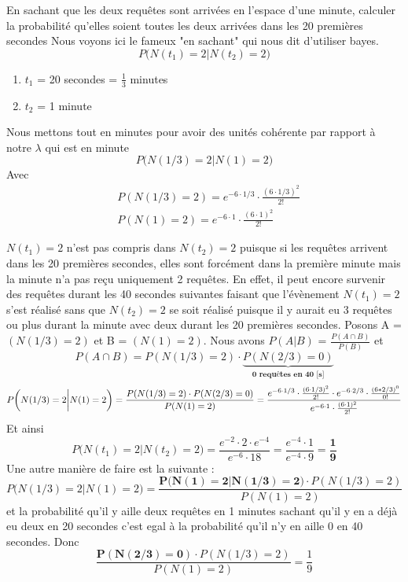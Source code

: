 \begin{exo}
\begin{subexo}{En sachant que les deux requêtes sont arrivées en l'espace d'une minute, calculer
      la probabilité qu'elles soient toutes les deux arrivées dans les 20 premières secondes}
    Nous voyons ici le fameux "en sachant" qui nous dit d'utiliser bayes.
    \[
      P\biggl( N(t_1) = 2 \biggl| N(t_2) = 2\biggr)
    \]
    \begin{enumerate}
      \item $t_1$ = 20 secondes = $\frac{1}{3}$ minutes
      \item $t_2$ = 1 minute
    \end{enumerate}
    Nous mettons tout en minutes pour avoir des unités cohérente par rapport à notre $\lambda$ qui est en minute
    \begin{equation*}
      P\biggl( N(1/3) = 2 \biggl| N(1) = 2\biggr)
    \end{equation*}
    Avec
    \begin{align*}
       & P(N(1/3) = 2) = e^{-6 \cdot 1/3} \cdot \frac{(6 \cdot 1/3)^2}{2 !} \\
       & P(N(1) = 2) = e^{-6 \cdot 1} \cdot \frac{(6 \cdot 1)^2}{2 !}
    \end{align*}

    $N(t_1) = 2$ n'est pas compris dans $N(t_2) = 2$ puisque si les requêtes
    arrivent dans les 20 premières secondes, elles sont forcément dans la première minute
    mais la minute n'a pas reçu uniquement 2 requêtes.
    En effet, il peut encore survenir des requêtes durant les 40 secondes suivantes faisant que
    l'évènement $N(t_1) = 2$ s'est réalisé sans que $N(t_2) = 2$ se soit réalisé puisque il y
    aurait eu 3 requêtes ou plus durant la minute avec deux durant les 20 premières secondes.
    Posons A = $(N(1/3) = 2)$ et B = $ (N(1) = 2)$.
    Nous avons $P( A | B)$ = $\frac{P(A \cap B)}{P(B)}$ et
    \[P(A \cap B) = P(N(1/3) = 2) \cdot \underbrace{P(N(2/3)= 0)}_{\textbf{0 requêtes en 40 [s]}}\]
    \begin{equation*}
      P\biggl( N(1/3) = 2 \biggl| N(1) = 2\biggr) 
      =\frac{P(N(1/3) = 2)\cdot P(N(2/3)= 0)}
          {P(N(1) = 2)} 
          \\
      = \frac{ e^{-6 \cdot 1/3} \cdot \frac{(6 \cdot 1/3)^2}{2 !} \cdot e^{-6\cdot 2/3}\cdot \frac{(6*2/3)^0}{0!}}{ e^{-6 \cdot 1} \cdot \frac{(6 \cdot 1)^2}{2 !} }
    \end{equation*}
    Et ainsi
    \[
      P\biggl( N(t_1) = 2 \biggl| N(t_2) = 2\biggr) = \frac{e^{-2}\cdot 2 \cdot e^{-4}}{e^{-6}\cdot 18} = \frac{e^{-4}\cdot 1}{e^{-4}\cdot 9} = \frac{\textbf{1}}{\textbf{9}}
    \]
    Une autre manière de faire est la suivante :
    \[
      P\biggl(N(1/3)=2 \biggl| N(1)=2 \biggr)= \frac{\mathbf{P\bigl( N(1)=2 | N(1/3)=2\bigr)} \cdot P(N(1/3)=2)}{P(N(1)=2)}
    \]
    et la probabilité qu'il y aille deux requêtes en 1 minutes sachant qu'il y en a déjà eu deux en 20 secondes
    c'est egal à la probabilité qu'il n'y en aille 0 en 40 secondes. Donc
    \[ \frac{\mathbf{P(N(2/3)=0)} \cdot P( N(1/3) = 2)}{P(N(1)=2)} = \frac{1}{9}\]
  \end{subexo}
\end{exo}
